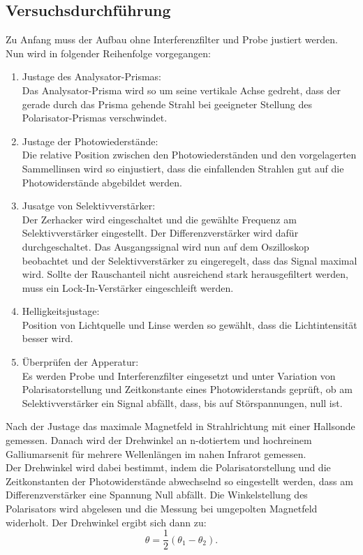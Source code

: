 \subsection{Versuchsdurchführung}
Zu Anfang muss der Aufbau ohne Interferenzfilter und Probe justiert werden.
Nun wird in folgender Reihenfolge vorgegangen:
\begin{enumerate}
  \item Justage des Analysator-Prismas:\\
  Das Analysator-Prisma wird so um seine vertikale Achse gedreht, dass
  der gerade durch das Prisma gehende Strahl bei geeigneter Stellung des
  Polarisator-Prismas verschwindet.
  \item Justage der Photowiederstände:\\
  Die relative Position zwischen den Photowiederständen und den vorgelagerten
  Sammellinsen wird so einjustiert, dass die einfallenden Strahlen gut auf
  die Photowiderstände abgebildet werden.
  \item Jusatge von Selektivverstärker:\\
  Der Zerhacker wird eingeschaltet und die gewählte Frequenz am Selektivverstärker
  eingestellt. Der Differenzverstärker wird dafür durchgeschaltet. Das Ausgangssignal wird
  nun auf dem Oszilloskop beobachtet und  der Selektivverstärker zu eingeregelt,
  dass das Signal maximal wird. Sollte der Rauschanteil nicht ausreichend stark
  herausgefiltert werden, muss ein Lock-In-Verstärker eingeschleift werden.
  \item Helligkeitsjustage:\\
  Position von Lichtquelle und Linse werden so gewählt, dass die Lichtintensität
  besser wird.
  \item Überprüfen der Apperatur:\\
  Es werden Probe und Interferenzfilter eingesetzt und unter Variation von
  Polarisatorstellung und Zeitkonstante eines Photowiderstands geprüft,
  ob am Selektivverstärker ein Signal abfällt, dass, bis auf Störspannungen, null ist.
\end{enumerate}
Nach der Justage das maximale Magnetfeld in Strahlrichtung mit einer Hallsonde gemessen. Danach wird
der Drehwinkel an n-dotiertem und hochreinem Galliumarsenit für mehrere Wellenlängen
im nahen Infrarot gemessen.\\
Der Drehwinkel wird dabei bestimmt, indem die Polarisatorstellung und die Zeitkonstanten der
Photowiderstände abwechselnd so eingestellt werden, dass am Differenzverstärker eine Spannung
Null abfällt. Die Winkelstellung des Polarisators wird abgelesen und die Messung
bei umgepolten Magnetfeld widerholt. Der Drehwinkel ergibt sich dann zu:
\begin{equation}
  \theta = \frac{1}{2} \left(\theta_1 - \theta_2 \right).
\end{equation}
